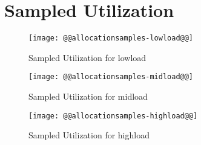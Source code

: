 \documentclass[11pt]{article}
\begin{document}
\newpage
\section{Sampled Utilization}
\begin{figure}[htbp]
  \begin{center}
    \texttt{[image: @@allocationsamples-lowload@@]}
    \caption{Sampled Utilization for lowload}
    \label{fig:allocationsamples-lowload}
  \end{center}
\end{figure}
\begin{figure}[htbp]
  \begin{center}
    \texttt{[image: @@allocationsamples-midload@@]}
    \caption{Sampled Utilization for midload}
    \label{fig:allocationsamples-midload}
  \end{center}
\end{figure}
\begin{figure}[htbp]
  \begin{center}
    \texttt{[image: @@allocationsamples-highload@@]}
    \caption{Sampled Utilization for highload}
    \label{fig:allocationsamples-highload}
  \end{center}
\end{figure}
\end{document}
